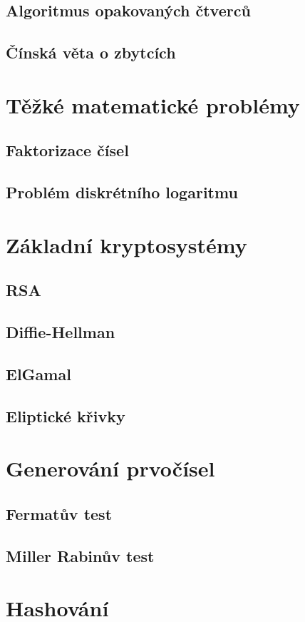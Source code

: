 \documentclass[10pt,a4paper]{article}
\begin{document}
\subsection{Algoritmus opakovaných čtverců}
\subsection{Čínská věta o zbytcích}

\section{Těžké matematické problémy}
\subsection{Faktorizace čísel}
\subsection{Problém diskrétního logaritmu}

\section{Základní kryptosystémy}
\subsection{RSA}
\subsection{Diffie-Hellman}
\subsection{ElGamal}
\subsection{Eliptické křivky}

\section{Generování prvočísel}
\subsection{Fermatův test}
\subsection{Miller Rabinův test}

\section{Hashování}
\end{document}
